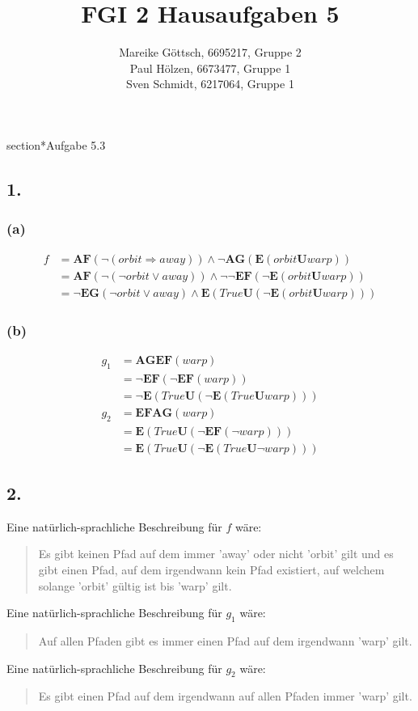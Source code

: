 \documentclass[12pt, paper=a4]{article}
\author{Mareike Göttsch, 6695217, Gruppe 2\\Paul Hölzen, 6673477, Gruppe 1\\Sven Schmidt, 6217064, Gruppe 1}
\title{FGI 2 Hausaufgaben 5}
\begin{document}
\maketitle

section*{Aufgabe 5.3}
\subsection*{1.}
\subsubsection*{(a)}
\begin{align*}
f &= \mathbf{AF}(\neg( orbit \Rightarrow away)) \land \neg\mathbf{AG}( \mathbf{E}( orbit\mathbf{U}warp)) \\ &=  \mathbf{AF}(\neg(\neg orbit\lor away))\land\neg\neg \mathbf{EF}(\neg \mathbf{E}(orbit\mathbf{U}warp)) \\ &= \neg \mathbf{EG}(\neg orbit\lor away)\land \mathbf{E}(True\mathbf{U}(\neg \mathbf{E}(orbit\mathbf{U}warp)))
\end{align*}
\subsubsection*{(b)}
\begin{align*}
g_{1} &= \mathbf{AGEF}(warp) \\ &= \neg \mathbf{EF}(\neg\mathbf{EF}(warp)) \\ &= \neg\mathbf{E}(True\mathbf{U}(\neg\mathbf{E}(True\mathbf{U}warp)))
\end{align*}
\begin{align*}
g_{2} &= \mathbf{EFAG}(warp) \\ &=\mathbf{E}(True\mathbf{U}(\neg \mathbf{EF}(\neg warp))) \\
&= \mathbf{E}(True\mathbf{U}(\neg \mathbf{E}(True\mathbf{U}\neg warp)))
\end{align*}

\subsection*{2.}
Eine natürlich-sprachliche Beschreibung für $f$ wäre:
\begin{quote}
	Es gibt keinen Pfad auf dem immer 'away' oder nicht 'orbit' gilt und es gibt einen Pfad, auf dem irgendwann kein Pfad existiert, auf welchem solange 'orbit' gültig ist bis 'warp' gilt.
\end{quote}
Eine natürlich-sprachliche Beschreibung für $g_{1}$ wäre:
\begin{quote}
	Auf allen Pfaden gibt es immer einen Pfad auf dem irgendwann 'warp' gilt.
\end{quote}
Eine natürlich-sprachliche Beschreibung für $g_{2}$ wäre:
\begin{quote}
	Es gibt einen Pfad auf dem irgendwann auf allen Pfaden immer 'warp' gilt.
\end{quote}
\end{document}

